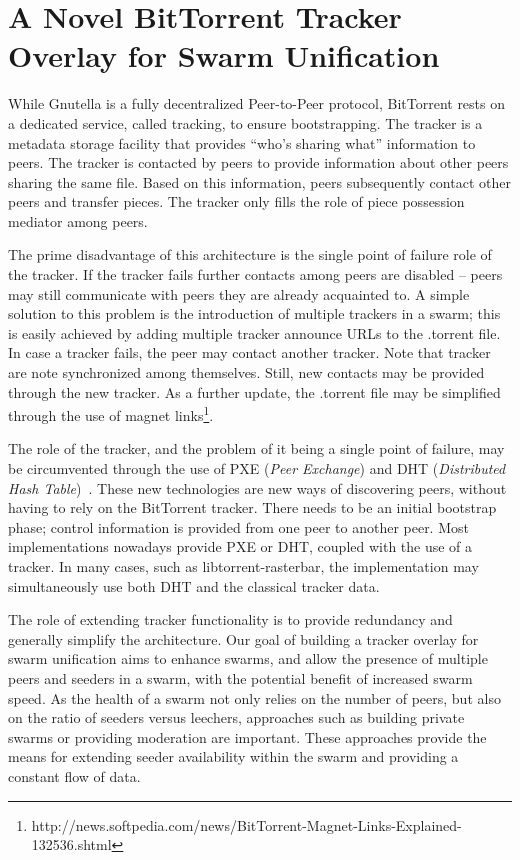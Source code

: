 
\chapter{A Novel BitTorrent Tracker Overlay for Swarm Unification}
\label{chapter:unified-tracker}

While Gnutella is a fully decentralized Peer-to-Peer protocol, BitTorrent
rests on a dedicated service, called tracking, to ensure bootstrapping. The
tracker is a metadata storage facility that provides ``who's sharing what''
information to peers. The tracker is contacted by peers to provide information
about other peers sharing the same file. Based on this information, peers
subsequently contact other peers and transfer pieces. The tracker only fills
the role of piece possession mediator among peers.

The prime disadvantage of this architecture is the single point of failure
role of the tracker. If the tracker fails further contacts among peers are
disabled -- peers may still communicate with peers they are already acquainted
to. A simple solution to this problem is the introduction of multiple trackers
in a swarm; this is easily achieved by adding multiple tracker announce URLs
to the .torrent file. In case a tracker fails, the peer may contact another
tracker. Note that tracker are note synchronized among themselves. Still,
new contacts may be provided through the new tracker. As a further update, the
.torrent file may be simplified through the use of magnet
links\footnote{http://news.softpedia.com/news/BitTorrent-Magnet-Links-Explained-132536.shtml}.

The role of the tracker, and the problem of it being a single point of
failure, may be circumvented through the use of PXE (\textit{Peer Exchange})
and DHT (\textit{Distributed Hash Table})~\cite{dht-paper}. These new
technologies are new ways of discovering peers, without having to rely on the
BitTorrent tracker. There needs to be an initial bootstrap phase; control
information is provided from one peer to another peer. Most implementations
nowadays provide PXE or DHT, coupled with the use of a tracker. In many cases,
such as libtorrent-rasterbar, the implementation may simultaneously use both
DHT and the classical tracker data.

The role of extending tracker functionality is to provide redundancy and
generally simplify the architecture. Our goal of building a tracker overlay
for swarm unification aims to enhance swarms, and allow the presence of
multiple peers and seeders in a swarm, with the potential benefit of increased
swarm speed. As the health of a swarm not only relies on the number of peers,
but also on the ratio of seeders versus leechers, approaches such as building
private swarms or providing moderation are important. These approaches provide
the means for extending seeder availability within the swarm and providing
a constant flow of data.

